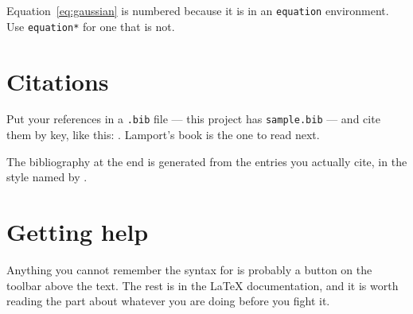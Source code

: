 \documentclass{article}
\begin{document}
Equation~\ref{eq:gaussian} is numbered because it is in an \verb|equation|
environment. Use \verb|equation*| for one that is not.

\section{Citations}

Put your references in a \verb|.bib| file --- this project has
\verb|sample.bib| --- and cite them by key, like this: \cite{greenwade93}.
Lamport's book \cite{lamport94} is the one to read next.

The bibliography at the end is generated from the entries you actually cite,
in the style named by \verb||.

\section{Getting help}

Anything you cannot remember the syntax for is probably a button on the
toolbar above the text. The rest is in the LaTeX documentation, and it is
worth reading the part about whatever you are doing before you fight it.



\end{document}
